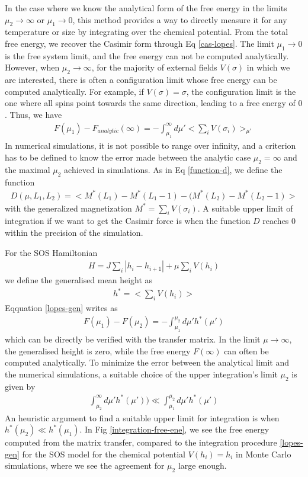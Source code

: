 In the case where we know the analytical form of the free energy in the limits $\mu_2 \to \infty$ or $\mu_1 \to 0$, this method provides a way to directly measure it for any temperature or size by integrating over the chemical potential.
From the total free energy, we recover the Casimir form through Eq \eqref{cas-lopes}.
The limit $\mu_1 \to 0$ is the free system limit, and the free energy can not be computed analytically. However, when $\mu_2 \to \infty$, for  the majority of external fields $V(\sigma)$ in which we are interested, there is often a configuration limit whose free energy can be computed analytically. For example, if $V(\sigma)=\sigma$, the configuration limit is the one where all spins point towards the same direction, leading to a free energy of $0$. Thus, we have
\begin{align}
   F(\mu_1) - F_{analytic}(\infty) = - \int_{\mu_1}^{\infty} d\mu'  < \sum_i V(\sigma_i) >_{\mu'} 
   \label{lopes-gen}
\end{align}
In numerical simulations, it is not possible to range over infinity, and a criterion has to be defined to know the error made between the analytic case $\mu_2 = \infty$ and the maximal $\mu_2$ achieved in simulations. As in Eq \eqref{function-d}, we define the function
\begin{align}
    D(\mu,L_1,L_2) =  < M^\ast(L_1)-M^\ast(L_1-1) - (M^\ast(L_2)-M^\ast(L_2-1) >
\end{align}
with the generalized magnetization $M^\ast = \sum_i V(\sigma_i)$. A suitable upper limit of integration if we want to get the Casimir force is when the function $D$ reaches $0$ within the precision of the simulation.


For the SOS Hamiltonian
\begin{align}
    H =  J \sum_i |h_i -h_{i+1}|  + \mu \sum_i V(h_i)
\end{align}
we define the generalised mean height as
\begin{align}
    h^\ast = < \sum_i V(h_i) >
\end{align}
Eqquation \eqref{lopes-gen} writes as
\begin{align}
   F(\mu_1) - F(\mu_2) = -  \int_{\mu_1}^{\mu_2} d\mu' h^\ast(\mu')
   \label{diff-gene}
\end{align}
which can be directly be verified with the transfer matrix. 
In the limit $\mu \to \infty$, the generalised height is zero, while the free energy $F(\infty)$ can often be computed analytically. 
To minimize the error between the analytical limit and the numerical simulations, a suitable choice of the upper integration's limit $\mu_2$ is given by
\begin{align}
    \int_{\mu_2}^\infty  d\mu' h^\ast(\mu')) \ll \int_{\mu_1}^{\mu_2}  d\mu' h^\ast(\mu')
\end{align}
An heuristic argument to find a suitable upper limit for integration is when $h^\ast(\mu_2) \ll h^\ast(\mu_1)$.
In Fig \ref{integration-free-ene}, we see the free energy computed from the matrix transfer, compared to the integration procedure \eqref{lopes-gen} for the SOS model for the chemical potential $V(h_i)=h_i$ in Monte Carlo simulations, where we see the agreement for $\mu_2$ large enough.

